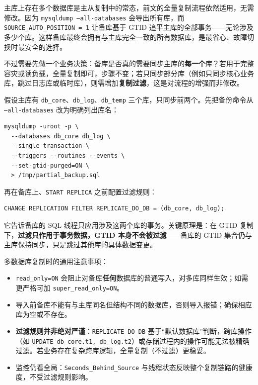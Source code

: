\documentclass[12pt,UTF8]{ctexbook}
\begin{document}
主库上存在多个数据库是主从复制中的常态，前文的全量复制流程依然适用，无需修改。因为 \texttt{mysqldump --all-databases} 会导出所有库，而 \texttt{SOURCE\_AUTO\_POSITION = 1} 让备库基于 GTID 追平主库的全部事务——无论涉及多少个库。这样备库最终会拥有与主库完全一致的所有数据库，是最省心、故障切换时最安全的选择。

不过需要先做一个业务决策：备库是否真的需要同步主库的\textbf{每一个}库？若用于完整容灾或读负载，全量复制即可，步骤不变；若只同步部分库（例如只同步核心业务库，跳过日志库或临时库），则需增加\textbf{复制过滤}，这是对流程的增强而非修改。

假设主库有 \texttt{db\_core}、\texttt{db\_log}、\texttt{db\_temp} 三个库，只同步前两个。先把备份命令从 \texttt{--all-databases} 改为明确列出库名：

\begin{lstlisting}
mysqldump -uroot -p \
  --databases db_core db_log \
  --single-transaction \
  --triggers --routines --events \
  --set-gtid-purged=ON \
  > /tmp/partial_backup.sql
\end{lstlisting}

再在备库上、\texttt{START REPLICA} 之前配置过滤规则：

\begin{lstlisting}
CHANGE REPLICATION FILTER REPLICATE_DO_DB = (db_core, db_log);
\end{lstlisting}

它告诉备库的 SQL 线程只应用涉及这两个库的事务。关键原理是：在 GTID 复制下，\textbf{过滤只作用于事务数据，GTID 本身不会被过滤}——备库的 GTID 集合仍与主库保持同步，只是跳过其他库的具体数据变更。

多数据库复制时的通用注意事项：

\begin{itemize}[leftmargin=2cm]
  \item \texttt{read\_only=ON} 会阻止对备库\textbf{任何}数据库的普通写入，对多库同样生效；如需更严格可加 \texttt{super\_read\_only=ON}。
  \item 导入前备库不能有与主库同名但结构不同的数据库，否则导入报错；确保相应库为空或不存在。
  \item \textbf{过滤规则并非绝对严谨}：\texttt{REPLICATE\_DO\_DB} 基于“默认数据库”判断，跨库操作（如 \texttt{UPDATE db\_core.t1, db\_log.t2}）或存储过程内的操作可能无法被精确过滤。若业务存在复杂跨库逻辑，全量复制（不过滤）更稳妥。
  \item 监控仍看全局：\texttt{Seconds\_Behind\_Source} 与线程状态反映整个复制链路的健康度，不受过滤规则影响。
\end{itemize}
\end{document}
